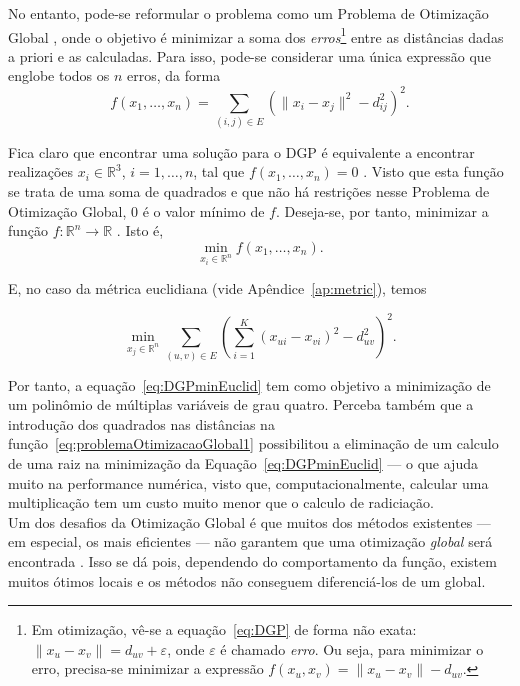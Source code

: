 No entanto, pode-se reformular o problema como um Problema de Otimização Global \cite{libertiEDG}, onde o objetivo é minimizar a soma dos \textit{erros}\footnote{Em otimização, vê-se a equação~\ref{eq:DGP} de forma não exata: $\lVert x_u - x_v \rVert = d_{uv} + \varepsilon$, onde $\varepsilon$ é chamado \textit{erro}. Ou seja, para minimizar o erro, precisa-se minimizar a expressão $f(x_u,x_v) = \lVert x_u - x_v \rVert - d_{uv}$.} entre as distâncias dadas a priori e as calculadas. Para isso, pode-se considerar uma única expressão que englobe todos os $n$ erros, da forma
\begin{equation}
	f(x_1,\dots,x_n) = \sum_{(i,j)\in E} \left(\lVert x_i - x_j \rVert^2 - d_{ij}^2\right)^2.
		\label{eq:problemaOtimizacaoGlobal1}
\end{equation}

Fica claro que encontrar uma solução para o DGP é equivalente a encontrar realizações $x_i \in \mathbb{R}^3$, $i=1,\dots,n$, tal que $f(x_1,\dots,x_n) = 0$ \cite{libertiEDG}. Visto que esta função se trata de uma soma de quadrados e que não há restrições nesse Problema de Otimização Global, 0 é o valor mínimo de $f$. Deseja-se, por tanto, minimizar a função $f: \mathbb{R}^n \longrightarrow \mathbb{R}$ \cite{carlileBook31Coloquio}. Isto é,
\begin{equation}
	\min_{x_i \in \mathbb{R}^n} f(x_1,\dots,x_n).
\end{equation}

E, no caso da métrica euclidiana (vide Apêndice~\ref{ap:metric}), temos

\begin{equation}
 \min_{x_j \in \mathbb{R}^n} \sum_{(u,v)\in E} \left(\sum_{i=1}^{K}(x_{ui} - x_{vi})^2 - d_{uv}^2\right)^2.
 \label{eq:DGPminEuclid}
\end{equation}

Por tanto, a equação~\ref{eq:DGPminEuclid} tem como objetivo a minimização de um polinômio de múltiplas variáveis de grau quatro. Perceba também que a introdução dos quadrados nas distâncias na função~\ref{eq:problemaOtimizacaoGlobal1} possibilitou a eliminação de um calculo de uma raiz na minimização da Equação~\ref{eq:DGPminEuclid} --- o que ajuda muito na performance numérica, visto que, computacionalmente, calcular uma multiplicação tem um custo muito menor que o calculo de radiciação.
\\

Um dos desafios da Otimização Global é que muitos dos métodos existentes --- em especial, os mais eficientes --- não garantem que uma otimização \textit{global} será encontrada \cite{libertiEDG}. Isso se dá pois, dependendo do comportamento da função, existem muitos ótimos locais e os métodos não conseguem diferenciá-los de um global. %

